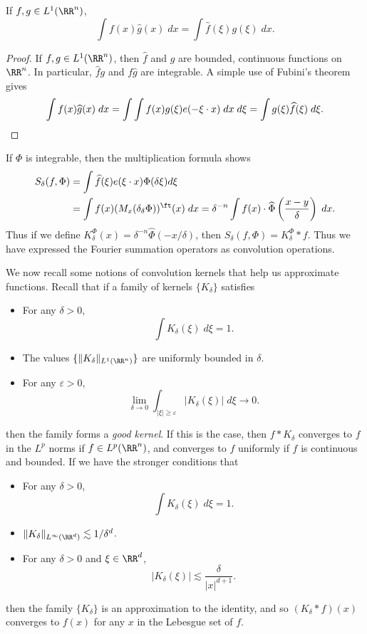 \begin{theorem}
	If $f,g \in L^1(\RR^n)$,
	\[ \int f(x) \widehat{g}(x)\; dx = \int \widehat{f}(\xi) g(\xi)\; dx. \]
\end{theorem}
\begin{proof}
	If $f, g \in L^1(\RR^n)$, then $\widehat{f}$ and $\widehat{g}$ are bounded, continuous functions on $\RR^n$. In particular, $\widehat{f} g$ and $f \widehat{g}$ are integrable. A simple use of Fubini's theorem gives
	\[ \int f(x) \widehat{g}(x)\; dx = \int \int f(x) g(\xi) e(- \xi \cdot x)\; dx\; d\xi = \int g(\xi) \widehat{f}(\xi)\; d\xi. \qedhere \]
\end{proof}

If $\Phi$ is integrable, then the multiplication formula shows
%
\begin{align*}
	S_\delta(f,\Phi) &= \int \widehat{f}(\xi) e(\xi \cdot x) \Phi(\delta \xi) d\xi\\
	&= \int f(x) (M_x (\delta_\delta \Phi))^\ft(x)\; dx = \delta^{-n} \int f(x) \cdot \widehat{\Phi} \left( \frac{x - y}{\delta} \right)\; dx.
\end{align*}
%
Thus if we define $K^\Phi_\delta(x) = \delta^{-n} \widehat{\Phi}(-x/\delta)$, then $S_\delta(f,\Phi) = K^\Phi_\delta * f$. Thus we have expressed the Fourier summation operators as convolution operations.

We now recall some notions of convolution kernels that help us approximate functions. Recall that if a family of kernels $\{ K_\delta \}$ satisfies
%
\begin{itemize}
	\item For any $\delta > 0$,
	\[ \int K_\delta(\xi)\; d\xi = 1. \]

	\item The values $\{ \| K_\delta \|_{L^1(\RR^n)} \}$ are uniformly bounded in $\delta$.

	\item For any $\varepsilon > 0$,
	\[ \lim_{\delta \to 0} \int_{|\xi| \geq \varepsilon} |K_\delta(\xi)|\; d\xi \to 0. \]
\end{itemize}
%
then the family forms a \emph{good kernel}. If this is the case, then $f * K_\delta$ converges to $f$ in the $L^p$ norms if $f \in L^p(\RR^n)$, and converges to $f$ uniformly if $f$ is continuous and bounded. If we have the stronger conditions that
%
\begin{itemize}
	\item For any $\delta > 0$,
	\[ \int K_\delta(\xi)\; d\xi = 1. \]

	\item $\| K_\delta \|_{L^\infty(\RR^d)} \lesssim 1/\delta^d$.
	\item For any $\delta > 0$ and $\xi \in \RR^d$,
	\[ |K_\delta(\xi)| \lesssim \frac{\delta}{|x|^{d+1}}. \]
\end{itemize}
%
then the family $\{ K_\delta \}$ is an approximation to the identity, and so $(K_\delta * f)(x)$ converges to $f(x)$ for any $x$ in the Lebesgue set of $f$.

